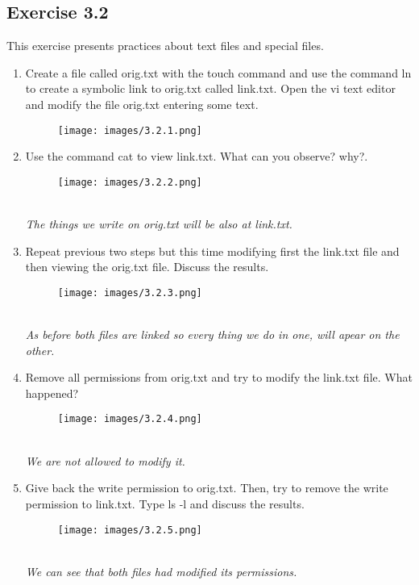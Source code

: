 \documentclass[12pt, titlepage,]{article}
\begin{document}
\subsection{Exercise 3.2}
This exercise presents practices about text files and special files. 
\begin{enumerate}

    \item  Create a file called orig.txt with the touch command and use the command ln to create a symbolic link to orig.txt called link.txt. Open the vi text editor and modify the file orig.txt entering some text. 
    \begin{figure}[!h] %
    \centering
    \texttt{[image: images/3.2.1.png]}
\end{figure}


    \item Use the command cat to view link.txt. What can you observe? why?. 
\begin{figure}[!h] %
    \centering
    \texttt{[image: images/3.2.2.png]}
\end{figure} \\
\textit{\color{blue} The things we write on orig.txt will be also at link.txt.}

\clearpage
    \item Repeat previous two steps but this time modifying first the link.txt file and then viewing the orig.txt file. Discuss the results. 
    \begin{figure}[h] %
    \centering
    \texttt{[image: images/3.2.3.png]}
\end{figure}
\\
\textit{\color{blue} As before both files are linked so every thing we do in one, will apear on the other.}


    \item Remove all permissions from orig.txt and try to modify the link.txt file. What happened? 
     \begin{figure}[h] %
    \centering
    \texttt{[image: images/3.2.4.png]}
\end{figure}
\\
\textit{\color{blue} We are not allowed to modify it.}

    \item Give back the write permission to orig.txt. Then, try to remove the write permission to link.txt. Type ls -l and discuss the results. 
    \begin{figure}[h] %
    \centering
    \texttt{[image: images/3.2.5.png]}
\end{figure}\\
\textit{\color{blue} We can see that both files had modified its permissions.}


\end{enumerate}
\end{document}
